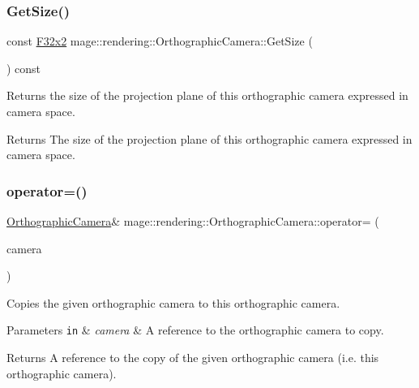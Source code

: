\subsubsection{\texorpdfstring{Get\+Size()}{GetSize()}}
{\footnotesize\ttfamily const \mbox{\hyperlink{namespacemage_a9dc0d34d6ecc87e4cfa4a826102117bc}{F32x2}} mage\+::rendering\+::\+Orthographic\+Camera\+::\+Get\+Size (\begin{DoxyParamCaption}{ }\end{DoxyParamCaption}) const\hspace{0.3cm}{\ttfamily [noexcept]}}

Returns the size of the projection plane of this orthographic camera expressed in camera space.

\begin{DoxyReturn}{Returns}
The size of the projection plane of this orthographic camera expressed in camera space. 
\end{DoxyReturn}
\mbox{\label{classmage_1_1rendering_1_1_orthographic_camera_adcd0a977ed5245aa4224dd1a679586f7}} 
\subsubsection{\texorpdfstring{operator=()}{operator=()}\hspace{0.1cm}{\footnotesize\ttfamily [1/2]}}
{\footnotesize\ttfamily \mbox{\hyperlink{classmage_1_1rendering_1_1_orthographic_camera}{Orthographic\+Camera}}\& mage\+::rendering\+::\+Orthographic\+Camera\+::operator= (\begin{DoxyParamCaption}\item[{const \mbox{\hyperlink{classmage_1_1rendering_1_1_orthographic_camera}{Orthographic\+Camera}} \&}]{camera }\end{DoxyParamCaption})\hspace{0.3cm}{\ttfamily [delete]}}

Copies the given orthographic camera to this orthographic camera.


\begin{DoxyParams}[1]{Parameters}
\mbox{\tt in}  & {\em camera} & A reference to the orthographic camera to copy. \\
\hline
\end{DoxyParams}
\begin{DoxyReturn}{Returns}
A reference to the copy of the given orthographic camera (i.\+e. this orthographic camera). 
\end{DoxyReturn}
\mbox{\label{classmage_1_1rendering_1_1_orthographic_camera_aa4518e7ef41bc0d841719198ac59d41f}} 

